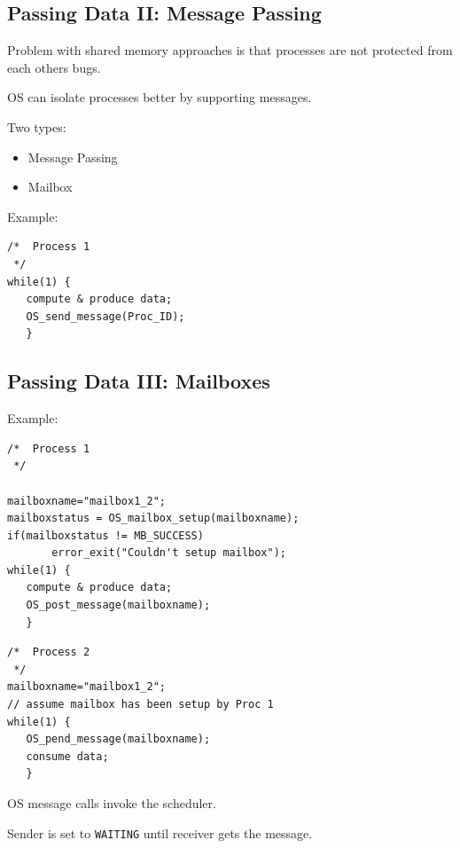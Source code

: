 \subsection{Passing Data II: Message Passing}
Problem with shared memory approaches is that processes are not protected from
each others bugs.

OS can isolate processes better by supporting messages.

Two types:
\begin{itemize}
	\item Message Passing
	\item Mailbox
\end{itemize}

Example:
\begin{verbatim}
/*  Process 1
 */
while(1) {
   compute & produce data;
   OS_send_message(Proc_ID);
   }
\end{verbatim}

\subsection{Passing Data III: Mailboxes}


Example:
\begin{verbatim}
/*  Process 1
 */

mailboxname="mailbox1_2";
mailboxstatus = OS_mailbox_setup(mailboxname);
if(mailboxstatus != MB_SUCCESS)
       error_exit("Couldn't setup mailbox");
while(1) {
   compute & produce data;
   OS_post_message(mailboxname);
   }
\end{verbatim}

\begin{verbatim}
/*  Process 2
 */
mailboxname="mailbox1_2";
// assume mailbox has been setup by Proc 1
while(1) {
   OS_pend_message(mailboxname);
   consume data;
   }
\end{verbatim}

OS message calls invoke the scheduler.

Sender is set to {\tt WAITING} until receiver gets the message.

